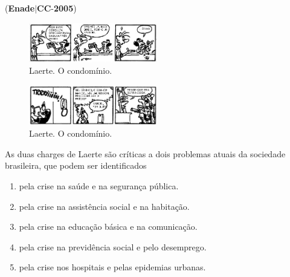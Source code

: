 \documentclass{exam}
\begin{document}
\begin{questions}
\question (\textbf{Enade}$|$\textbf{CC}-\textbf{2005}) \begin{figure}[H]
	\begin{center}
		\includegraphics[width=0.5\textwidth]{CIENCIA_DA_COMPUTACAO_Prova2005-utf8_figuras/fig-0002.jpg}
		\caption{Laerte. O condomínio.}
	\end{center}
\end{figure}
\begin{figure}[H]
	\begin{center}
		\includegraphics[width=0.5\textwidth]{CIENCIA_DA_COMPUTACAO_Prova2005-utf8_figuras/fig-0003.jpg}
		\caption{Laerte. O condomínio.}
	\end{center}
\end{figure}
As duas charges de Laerte são críticas a dois problemas atuais da sociedade brasileira, que podem ser identificados
	\begin{enumerate}[label=\alph*)]
		\item  pela crise na saúde e na segurança pública.
		\item  pela crise na assistência social e na habitação.
		\item  pela crise na educação básica e na comunicação.
		\item  pela crise na previdência social e pelo desemprego.
		\item  pela crise nos hospitais e pelas epidemias urbanas.

	\end{enumerate}


\end{questions}
\end{document}
